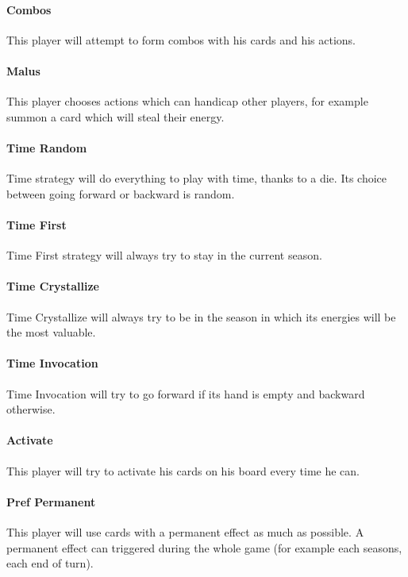             \paragraph{Combos}
            This player will attempt to form combos with his cards and his actions.
            
            \paragraph{Malus}
            This player chooses actions which can handicap other players, for example summon a card which will steal their energy. 
            
            \paragraph{Time Random}
            Time strategy will do everything to play with time, thanks to a die. Its choice between going forward or backward is random.
            
            \paragraph{Time First}
            Time First strategy will always try to stay in the current season.
            
            \paragraph{Time Crystallize}
            Time Crystallize will always try to be in the season in which its energies will be the most valuable.
            
            \paragraph{Time Invocation}
            Time Invocation will try to go forward if its hand is empty and backward otherwise.
            
            \paragraph{Activate}
            This player will try to activate his cards on his board every time he can.
            
            \paragraph{Pref Permanent}
            This player will use cards with a permanent effect as much as possible. A permanent effect can triggered during the whole game (for example each seasons, each end of turn).
        
